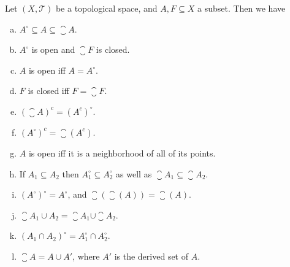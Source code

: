 \begin{proposition}
	Let $ (X,\mathcal{T}) $ be a topological space, and $ A,F \subseteq X $ a subset. Then we have
	\begin{enumerate}[(a)]
		\item $ A^\circ \subseteq A \subseteq \closure{A} $.
		\item $ A^\circ $ is open and $ \closure{F} $ is closed.
		\item $ A $ is open iff $ A = A^\circ $.
		\item $ F $ is closed iff $ F = \closure{F} $.
		\item $ (\closure{A})^c = (A^c)^\circ. $
		\item $ (A^\circ)^c = \closure{(A^c)} $.
		\item $ A $ is open iff it is a neighborhood of all of its points.
		\item If $ A_1 \subseteq A_2 $ then $ A_1^\circ \subseteq A_2^\circ $ as well as $ \closure{A_1} \subseteq \closure{A_2} $.
		\item $ (A^\circ)^\circ = A^\circ $, and $ \closure{(\closure(A))} = \closure(A) $.
		\item $ \closure{A_1\cup A_2} = \closure{A_1} \cup \closure{A_2} $.
		\item $ (A_1\cap A_2)^\circ = A_1^\circ \cap A_2^\circ $.
		\item $ \closure{A} = A \cup A' $, where $ A' $ is the derived set of $ A $.
	\end{enumerate}
\end{proposition}
